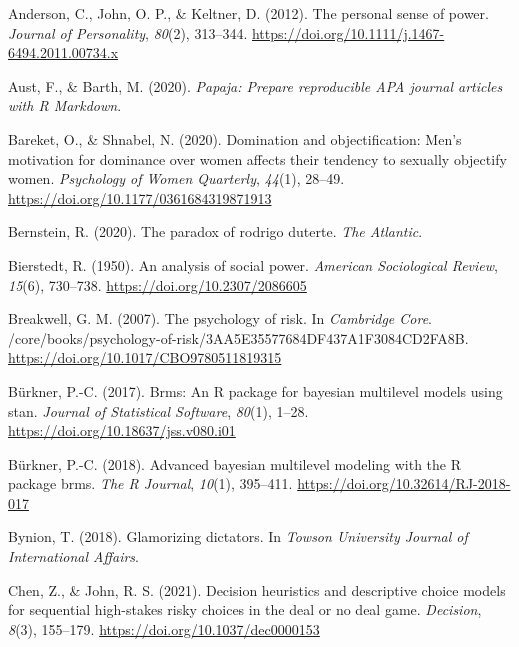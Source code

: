 \documentclass[
  donotrepeattitle,doc, 12pt, a4paper,floatsintext]{apa7}
\newlength{\cslhangindent}
\newlength{\cslentryspacingunit} %
\newenvironment{CSLReferences}[2] %
 {%
  \setlength{\parindent}{0pt}
  \ifodd #1
  \let\oldpar\par
  \def\par{\hangindent=\cslhangindent\oldpar}
  \fi
  \setlength{\parskip}{#2\cslentryspacingunit}
 }%
 {}
\begin{document}
\hypertarget{refs}{}
\begin{CSLReferences}{1}{0}
\leavevmode{}%
Anderson, C., John, O. P., \& Keltner, D. (2012). The personal sense of power. \emph{Journal of Personality}, \emph{80}(2), 313--344. \url{https://doi.org/10.1111/j.1467-6494.2011.00734.x}

\leavevmode{}%
Aust, F., \& Barth, M. (2020). \emph{Papaja: {Prepare} reproducible {APA} journal articles with {R Markdown}}.

\leavevmode{}%
Bareket, O., \& Shnabel, N. (2020). Domination and objectification: Men's motivation for dominance over women affects their tendency to sexually objectify women. \emph{Psychology of Women Quarterly}, \emph{44}(1), 28--49. \url{https://doi.org/10.1177/0361684319871913}

\leavevmode{}%
Bernstein, R. (2020). The paradox of rodrigo duterte. \emph{The Atlantic}.

\leavevmode{}%
Bierstedt, R. (1950). An analysis of social power. \emph{American Sociological Review}, \emph{15}(6), 730--738. \url{https://doi.org/10.2307/2086605}

\leavevmode{}%
Breakwell, G. M. (2007). The psychology of risk. In \emph{Cambridge Core}. /core/books/psychology-of-risk/3AA5E35577684DF437A1F3084CD2FA8B. \url{https://doi.org/10.1017/CBO9780511819315}

\leavevmode{}%
Bürkner, P.-C. (2017). Brms: An {R} package for bayesian multilevel models using stan. \emph{Journal of Statistical Software}, \emph{80}(1), 1--28. \url{https://doi.org/10.18637/jss.v080.i01}

\leavevmode{}%
Bürkner, P.-C. (2018). Advanced bayesian multilevel modeling with the {R} package brms. \emph{The R Journal}, \emph{10}(1), 395--411. \url{https://doi.org/10.32614/RJ-2018-017}

\leavevmode{}%
Bynion, T. (2018). Glamorizing dictators. In \emph{Towson University Journal of International Affairs}.

\leavevmode{}%
Chen, Z., \& John, R. S. (2021). Decision heuristics and descriptive choice models for sequential high-stakes risky choices in the deal or no deal game. \emph{Decision}, \emph{8}(3), 155--179. \url{https://doi.org/10.1037/dec0000153}


\end{CSLReferences}
\end{document}

